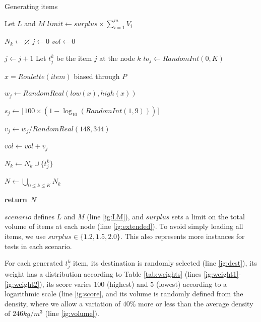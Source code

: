 \documentclass[preprint]{elsarticle}
\renewcommand{\Return}{\State \textbf{return}~}
\newcommand{\round}[1]{\ensuremath{\lfloor#1\rceil}}
\begin{document}
\begin{algorithm}[H]
	\caption{Generating items}  \label{alg:itemsgen}
	\begin{algorithmic}[1]
		
		\State Let $L$\/ and $M$   \label{ig:LM}
		\State $limit \gets surplus \times \sum_{i=1}^{m} V_i$ \label{ig:extended}

		
			\State $N_k \gets \varnothing$
			\State $j \gets 0$
			\State $vol \gets 0$	\label{ig:totals}	
			
				\State $j \gets j+1$
				\State Let $t_j^k$\/ be the item $j$\/ at the node $k$
				\Repeat
					\State $to_j \gets RandomInt(0, K)$ \label{ig:dest}
				
				\State $x = Roulette(item)$ biased through $P$ \label{ig:weight1} 
					
				\State $w_j \gets RandomReal(low(x), high(x))$        \label{ig:weight2}		
				
				\State $s_j \gets \round{100 \times (1 - \log_{10}(RandomInt(1, 9)))} $ \label{ig:score}
				
				\State $v_j \gets w_j / RandomReal(148, 344)$ \label{ig:volume}
				
				\State $vol \gets vol + v_j$ 
				
				\State $N_k \gets N_k \cup \{t_j^k\}$ 
			\EndWhile

		\EndFor
		
		\State $N \gets \bigcup_{0 \leq k \leq K} N_k$
		
		\Return $N$
		
		\EndProcedure
	\end{algorithmic}
\end{algorithm}

$scenario$\/ defines $L$\/ and $M$\/ (line \ref{ig:LM}), and $surplus$\/ sets a limit on the total volume of items at each node (line \ref{ig:extended}). To avoid simply loading all items, we use $surplus \in \{1.2, 1.5, 2.0\}$. This also represents more instances for tests in each scenario.

For each generated $t^k_j$\/ item, its destination is randomly selected (line \ref{ig:dest}), its weight has a distribution according to Table \ref{tab:weights} (lines \ref{ig:weight1}-\ref{ig:weight2}), its score varies $100$\/ (highest) and $5$\/ (lowest) according to a logarithmic scale (line \ref{ig:score}, and its volume is randomly defined from the density, where we allow a variation of 40\% more or less than the average density of $246 kg/m^3$\/ (line \ref{ig:volume}).
\end{document}
